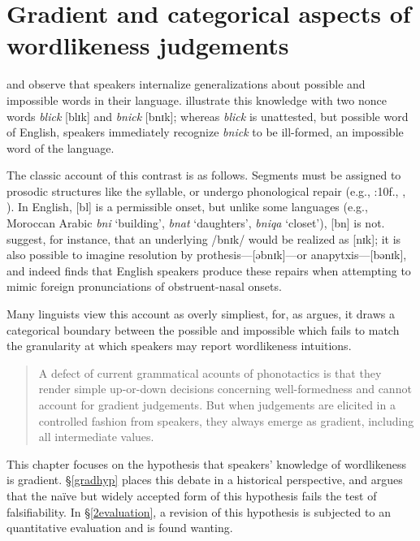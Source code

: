 \chapter{Gradient and categorical aspects of wordlikeness judgements}
\label{gradience}

\citet{Halle1962} and \citet{Chomsky1965} observe that speakers internalize generalizations about possible and impossible words in their language. \citeauthor{Chomsky1965} illustrate this knowledge with two nonce words \emph{blick} [blɪk] and \emph{bnick} [bnɪk]; whereas \emph{blick} is unattested, but possible word of English, 
speakers immediately recognize \emph{bnick} to be ill-formed, an impossible word of the language.

The classic account of this contrast is as follows. Segments must be assigned to prosodic structures like the syllable, or undergo phonological repair (e.g., \citealt{Hooper1973}:10f., \citealt{Ito1989a}, \citealt{Noske1992}). In English, [bl] is a permissible onset, but unlike some languages (e.g., Moroccan Arabic \emph{bni} `building', \emph{bnat} `daughters', \emph{bniqa} `closet'), [bn] is not. \citet[][19f.]{Wolf2009} suggest, for instance, that an underlying /bnɪk/ would be realized as [nɪk]; it is also possible to imagine resolution by prothesis---[əbnɪk]---or anapytxis---[bənɪk], and indeed \citet{Davidson2006b} finds that English speakers produce these repairs when attempting to mimic foreign pronunciations of obstruent-nasal onsets.

Many linguists view this account as overly simpliest, for, as \citeauthor{Shademan2006} argues, it draws a categorical boundary between the possible and impossible which fails to match the granularity at which speakers may report wordlikeness intuitions.

\begin{quote}
A defect of current grammatical acounts of phonotactics is that they render simple up-or-down decisions concerning well-formedness and cannot account for gradient judgements. But when judgements are elicited in a controlled fashion from speakers, they always emerge as gradient, including all intermediate values. \citep[][371]{Shademan2006} 
\end{quote}

This chapter focuses on the hypothesis that speakers' knowledge of wordlikeness is gradient. \S\ref{gradhyp} places this debate in a historical perspective, and argues that the naïve but widely accepted form of this hypothesis fails the test of falsifiability. In \S\ref{2evaluation}, a revision of this hypothesis is subjected to an quantitative evaluation and is found wanting.

